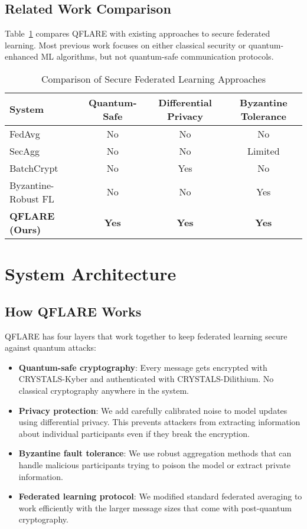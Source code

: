 \documentclass[journal]{IEEEtran}
\begin{document}
\subsection{Related Work Comparison}

Table~\ref{tab:comparison} compares QFLARE with existing approaches to secure federated learning. Most previous work focuses on either classical security or quantum-enhanced ML algorithms, but not quantum-safe communication protocols.

\begin{table}[htbp]
\centering
\caption{Comparison of Secure Federated Learning Approaches}
\label{tab:comparison}
\begin{tabular}{@{}lccc@{}}
\toprule
\textbf{System} & \textbf{Quantum-Safe} & \textbf{Differential Privacy} & \textbf{Byzantine Tolerance} \\
\midrule
FedAvg \cite{bonawitz2017practical} & No & No & No \\
SecAgg \cite{bonawitz2017practical} & No & No & Limited \\
BatchCrypt \cite{zhang2020batchcrypt} & No & Yes & No \\
Byzantine-Robust FL \cite{blanchard2017machine} & No & No & Yes \\
\textbf{QFLARE (Ours)} & \textbf{Yes} & \textbf{Yes} & \textbf{Yes} \\
\bottomrule
\end{tabular}
\end{table}

\section{System Architecture}

\subsection{How QFLARE Works}

QFLARE has four layers that work together to keep federated learning secure against quantum attacks:

\begin{itemize}
\item \textbf{Quantum-safe cryptography}: Every message gets encrypted with CRYSTALS-Kyber and authenticated with CRYSTALS-Dilithium. No classical cryptography anywhere in the system.
\item \textbf{Privacy protection}: We add carefully calibrated noise to model updates using differential privacy. This prevents attackers from extracting information about individual participants even if they break the encryption.
\item \textbf{Byzantine fault tolerance}: We use robust aggregation methods that can handle malicious participants trying to poison the model or extract private information.
\item \textbf{Federated learning protocol}: We modified standard federated averaging to work efficiently with the larger message sizes that come with post-quantum cryptography.
\end{itemize}
\end{document}
